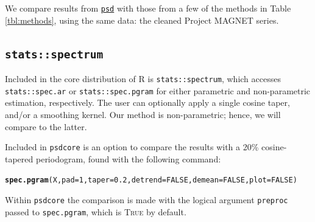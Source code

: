 \documentclass[10pt]{article}\usepackage[]{graphicx}\usepackage[]{color}
\makeatletter
\newcommand{\hlnum}[1]{\textcolor[rgb]{0.686,0.059,0.569}{#1}}%
\newcommand{\hlstd}[1]{\textcolor[rgb]{0.345,0.345,0.345}{#1}}%
\newcommand{\hlkwc}[1]{\textcolor[rgb]{0.333,0.667,0.333}{#1}}%
\newcommand{\hlkwd}[1]{\textcolor[rgb]{0.737,0.353,0.396}{\textbf{#1}}}%
\newenvironment{kframe}{%
 \def\at@end@of@kframe{}%
 \ifinner\ifhmode%
  \def\at@end@of@kframe{\end{minipage}}%
  \begin{minipage}{\columnwidth}%
 \fi\fi%
 \def\FrameCommand##1{\hskip\@totalleftmargin \hskip-\fboxsep
 \colorbox{shadecolor}{##1}\hskip-\fboxsep
     \hskip-\linewidth \hskip-\@totalleftmargin \hskip\columnwidth}%
 \MakeFramed {\advance\hsize-\width
   \@totalleftmargin\z@ \linewidth\hsize
   \@setminipage}}%
 {\par\unskip\endMakeFramed%
 \at@end@of@kframe}
\newenvironment{knitrout}{}{} %
\newcommand{\SC}[1]{\textsc{#1}}
\newcommand{\Rcmd}[1]{\texttt{#1}}
\newcommand{\psd}[0]{\href{http://abarbour.github.com/psd/}{\color{blue}\Rcmd{psd}}}
\makeatother
\begin{document}


We compare results from
\psd{} with those from a few of the methods in Table \ref{tbl:methods},
using the same data: the cleaned Project MAGNET series.

\subsection{\Rcmd{stats::spectrum}}

Included in the core distribution of R is \Rcmd{stats::spectrum}, which
accesses \Rcmd{stats::spec.ar} or \Rcmd{stats::spec.pgram} for either
parametric and non-parametric estimation, respectively.  
The user can optionally apply a single cosine taper, and/or a smoothing kernel.
Our method is non-parametric; hence, we will compare to the latter.

Included in \Rcmd{psdcore} is an option to compare the 
results with a 20\% cosine-tapered periodogram,
found with the following command:
\begin{knitrout}
\color{fgcolor}\begin{kframe}
\begin{alltt}
\hlkwd{spec.pgram}\hlstd{(X,} \hlkwc{pad}\hlstd{=}\hlnum{1}\hlstd{,} \hlkwc{taper}\hlstd{=}\hlnum{0.2}\hlstd{,} \hlkwc{detrend}\hlstd{=}\hlnum{FALSE}\hlstd{,} \hlkwc{demean}\hlstd{=}\hlnum{FALSE}\hlstd{,} \hlkwc{plot}\hlstd{=}\hlnum{FALSE}\hlstd{)}
\end{alltt}
\end{kframe}
\end{knitrout}
Within \Rcmd{psdcore} the comparison is
made with
the logical argument \Rcmd{preproc} 
passed to \Rcmd{spec.pgram}, which is \SC{True} by default.
\end{document}
